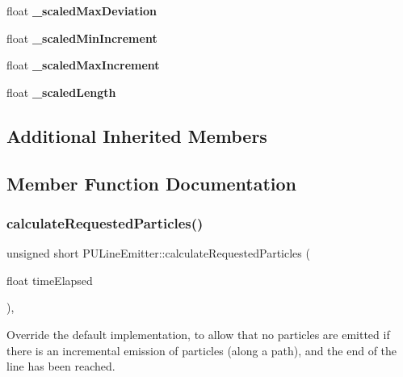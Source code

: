 \begin{DoxyCompactItemize}
float {\bfseries \+\_\+scaled\+Max\+Deviation}
\item 
\mbox{\label{classPULineEmitter_a866bf4ee7aad49ab5652e2ad766ac343}} 
float {\bfseries \+\_\+scaled\+Min\+Increment}
\item 
\mbox{\label{classPULineEmitter_a2fc6ff64caa2349dd3f99b8fc1fad292}} 
float {\bfseries \+\_\+scaled\+Max\+Increment}
\item 
\mbox{\label{classPULineEmitter_a4436eccd2980bf4cad266a54ada7b246}} 
float {\bfseries \+\_\+scaled\+Length}
\end{DoxyCompactItemize}
\subsection*{Additional Inherited Members}


\subsection{Member Function Documentation}
\mbox{\label{classPULineEmitter_a74e5ce3953d092de3a380a136475e322}} 
\subsubsection{\texorpdfstring{calculate\+Requested\+Particles()}{calculateRequestedParticles()}\hspace{0.1cm}{\footnotesize\ttfamily [1/2]}}
{\footnotesize\ttfamily unsigned short P\+U\+Line\+Emitter\+::calculate\+Requested\+Particles (\begin{DoxyParamCaption}\item[{float}]{time\+Elapsed }\end{DoxyParamCaption})\hspace{0.3cm}{\ttfamily [override]}, {\ttfamily [virtual]}}

Override the default implementation, to allow that no particles are emitted if there is an incremental emission of particles (along a path), and the end of the line has been reached. 

